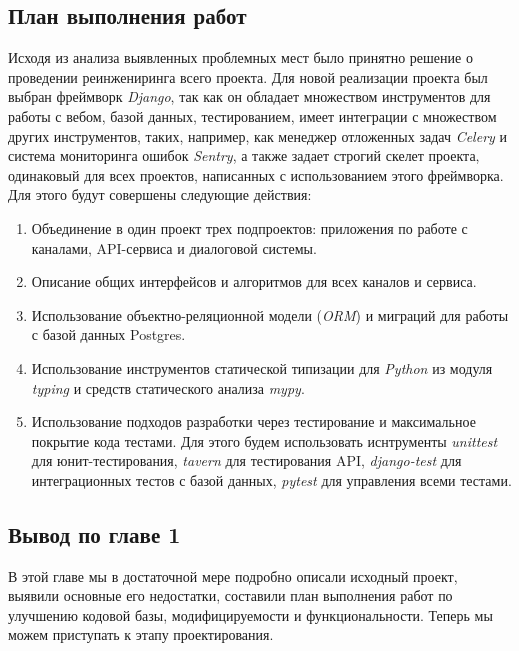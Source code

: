     \subsection{План выполнения работ}
    Исходя из анализа выявленных проблемных мест было принятно решение о проведении реинжениринга всего проекта.
    Для новой реализации проекта был выбран фреймворк \textit{Django}\cite{docs.django}, так как он обладает множеством инструментов
    для работы с вебом, базой данных, тестированием, имеет интеграции с множеством других инструментов, таких, например,
    как менеджер отложенных задач \textit{Celery}\cite{docs.celery} и система мониторинга ошибок \textit{Sentry},
    а также задает строгий скелет проекта, одинаковый для всех проектов, написанных с использованием этого фреймворка.
    Для этого будут совершены следующие действия:
    \begin{enumerate}
        \item Объединение в один проект трех подпроектов: приложения по работе с каналами, API-сервиса и диалоговой системы.
        \item Описание общих интерфейсов и алгоритмов для всех каналов и сервиса.
        \item Использование объектно-реляционной модели (\textit{ORM}) и миграций для работы с базой данных Postgres\cite{postgres.stepic}.
        \item Использование инструментов статической типизации для \textit{Python} из модуля \textit{typing}
        и средств статического анализа \textit{mypy}\cite{docs.python}.
        \item Использование подходов разработки через тестирование и максимальное покрытие кода тестами. Для этого
        будем использовать иснтрументы \textit{unittest} для юнит-тестирования, \textit{tavern} для тестирования API,
        \textit{django-test} для интеграционных тестов с базой данных, \textit{pytest} для управления всеми тестами.
    \end{enumerate}

    \subsection*{Вывод по главе 1}
    В этой главе мы в достаточной мере подробно описали исходный проект, выявили основные его
    недостатки, составили план выполнения работ по улучшению кодовой базы, модифицируемости
    и функциональности. Теперь мы можем приступать к этапу проектирования.
